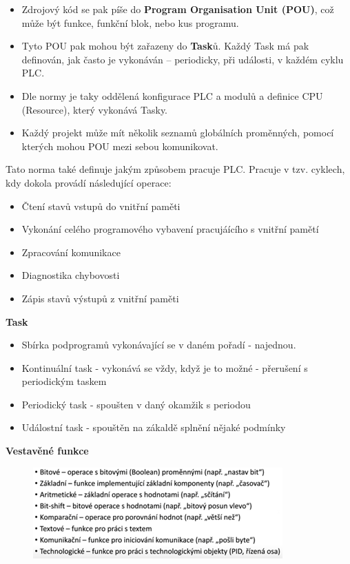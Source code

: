 \begin{itemize}
\begin{itemize}
  \item Zdrojový kód se pak píše do \textbf{Program Organisation Unit (POU)}, což může být funkce, funkční blok, nebo kus programu.
  \item Tyto POU pak mohou být zařazeny do \textbf{Task}ů. Každý Task má pak definován, jak často je vykonáván – periodicky, při události, v každém cyklu PLC. 
  \item Dle normy je taky oddělená konfigurace PLC a modulů a definice CPU (Resource), který vykonává Tasky.
  \item Každý projekt může mít několik seznamů globálních proměnných, pomocí kterých mohou POU mezi sebou komunikovat.  
\end{itemize}

Tato norma také definuje jakým způsobem pracuje PLC. Pracuje v tzv. cyklech, kdy dokola provádí následující operace:
\begin{itemize}
  \item Čtení stavů vstupů do vnitřní paměti
  \item Vykonání celého programového vybavení pracujáícího s vnitřní pamětí
  \item Zpracování komunikace
  \item Diagnostika chybovosti
  \item Zápis stavů výstupů z vnitřní paměti
\end{itemize}

\textbf{Task}
\begin{itemize}
  \item Sbírka podprogramů vykonávající se v daném pořadí - najednou.
  \item Kontinuální task - vykonává se vždy, když je to možné - přerušení s periodickým taskem
  \item Periodický task - spoušten v daný okamžik s periodou
  \item Událostní task - spouštěn na zákaldě splnění nějaké podmínky
\end{itemize}

\textbf{Vestavěné funkce}
\begin{figure}[h]
  \begin{center}
    \includegraphics[scale = 1]{img/Picture15.png}
  \end{center}
\end{figure}


\end{itemize}
